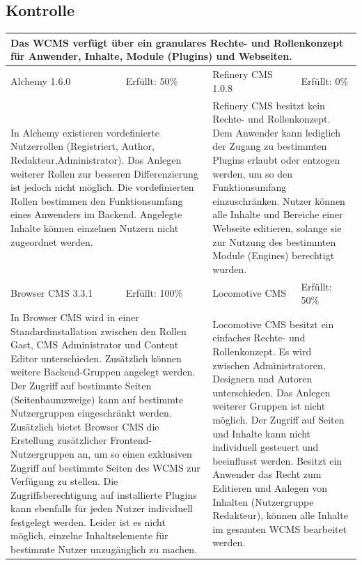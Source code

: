 \subsection{Kontrolle}
\begin{tabular}[!ht]{|l|l|l|l|}
\hline
\multicolumn{4}{|p{15cm}|}{\textbf{Das WCMS verfügt über ein granulares Rechte- und Rollenkonzept für Anwender, Inhalte, Module (Plugins) und Webseiten.}} \\
\hline
  Alchemy 1.6.0 & \cellcolor{yellow}Erfüllt: 50\% & Refinery CMS 1.0.8 & \cellcolor{red}Erfüllt: 0\% \\
  \hline
  \multicolumn{2}{|p{7.5cm}|}{In Alchemy existieren vordefinierte Nutzerrollen (Registriert, Author, Redakteur,Administrator). Das Anlegen weiterer Rollen zur besseren Differenzierung ist jedoch nicht möglich. Die vordefinierten Rollen bestimmen den Funktionsumfang eines Anwenders im Backend. Angelegte Inhalte können einzelnen Nutzern nicht zugeordnet werden.}
   & \multicolumn{2}{p{7.5cm}|}{Refinery CMS besitzt kein Rechte- und Rollenkonzept. Dem Anwender kann lediglich der Zugang zu bestimmten Plugins erlaubt oder entzogen werden, um so den Funktionsumfang einzuschränken. Nutzer können alle Inhalte und Bereiche einer Webseite editieren, solange sie zur Nutzung des bestimmten Module (Engines) berechtigt wurden.} \\
  \hline
  Browser CMS 3.3.1 & \cellcolor{green}Erfüllt: 100\% & Locomotive CMS & \cellcolor{yellow}Erfüllt: 50\% \\
  \hline
  \multicolumn{2}{|p{7.5cm}|}{In Browser CMS wird in einer Standardinstallation zwischen den Rollen Gast, CMS Administrator und Content Editor unterschieden. Zusätzlich können weitere Backend-Gruppen angelegt werden. Der Zugriff auf bestimmte Seiten (Seitenbaumzweige) kann auf bestimmte Nutzergruppen eingeschränkt werden. Zusätzlich bietet Browser CMS die Erstellung zusätzlicher Frontend-Nutzergruppen an, um so einen exklusiven Zugriff auf bestimmte Seiten des WCMS zur Verfügung zu stellen. Die Zugriffsberechtigung auf installierte Plugins kann ebenfalls für jeden Nutzer individuell festgelegt werden. Leider ist es nicht möglich, einzelne Inhaltselemente für bestimmte Nutzer unzugänglich zu machen.} & \multicolumn{2}{p{7.5cm}|}{Locomotive CMS besitzt ein einfaches Rechte- und Rollenkonzept. Es wird zwischen Administratoren, Designern und Autoren unterschieden. Das Anlegen weiterer Gruppen ist nicht möglich. Der Zugriff auf Seiten und Inhalte kann nicht individuell gesteuert und beeinflusst werden. Besitzt ein Anwender das Recht zum Editieren und Anlegen von Inhalten (Nutzergruppe Redakteur), können alle Inhalte im gesamten WCMS bearbeitet werden.} \\
\hline
\end{tabular}
